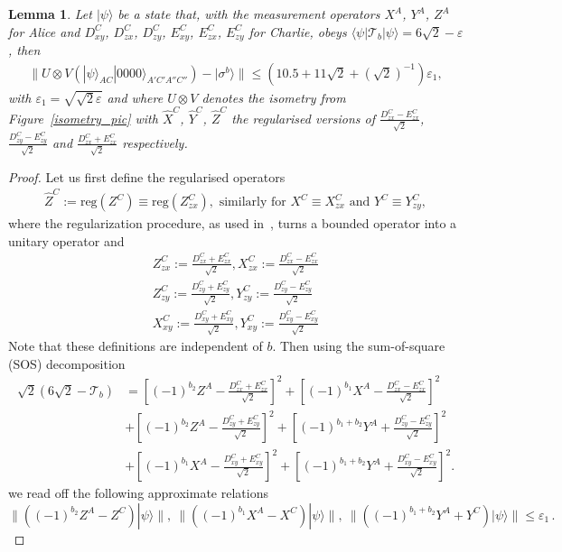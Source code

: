 \documentclass[onecolumn,prx,amsmath,amssymb,12pt]{revtex4-2}
\newtheorem{lem}{Lemma}
\def\bra#1{\langle#1|} \def\ket#1{|#1\rangle}
\def\norm#1{\| #1 \| }
\begin{document}
\begin{appendix}
\begin{lem} \label{lem1} Let  $\ket{\psi}$ be a state that, with the measurement operators $X^A$, $Y^A$, $Z^A$ for Alice and $D^C_{xy}$, $D^C_{zx}$, $D^C_{zy}$, $E^C_{xy}$, $E^C_{zx}$, $E^C_{zy}$ for Charlie, obeys $\bra{\psi}\mathscr{T}_b\ket{\psi}=6\sqrt{2}-\varepsilon$, then
\begin{align}
    \norm{U\otimes V\left(\ket{\psi}_{{AC}}\ket{0000}_{A'C'A''C''}\right) - \ket{\sigma^b}}  \leq  (10.5+11\sqrt{2}+(\sqrt{2})^{-1})\varepsilon_1,
    \label{eps2}
\end{align}
with $\varepsilon_1=\sqrt{\sqrt{2}\varepsilon}$ and where $U \otimes V$ denotes the isometry from Figure~\ref{isometry_pic} with $\hat{X}^C$, $\hat{Y}^C$, $\hat{Z}^C$ the regularised versions of $\frac{D^C_{zx}-E^C_{zx}}{\sqrt{2}}$, $\frac{D^C_{zy}-E^C_{zy}}{\sqrt{2}}$ and  $\frac{D^C_{zx}+E^C_{zx}}{\sqrt{2}}$ respectively.
\end{lem}


\begin{proof}
Let us first define the regularised operators
\begin{align}
    \hat Z^C := \text{reg}(Z^C) \equiv \text{reg}(Z^C_{zx}), \text{ similarly for } X^C \equiv X^C_{zx} \text{ and } Y^C\equiv Y^C_{zy},
\end{align}
where the regularization procedure, as used in~\cite{self_testing}, turns a bounded operator into a unitary operator and 
\begin{align}
    Z^C_{zx}:=\frac{D^C_{zx}+E^C_{zx}}{\sqrt{2}}, X^C_{zx}:=\frac{D^C_{zx}-E^C_{zx}}{\sqrt{2}}\\
    Z^C_{zy}:=\frac{D^C_{zy}+E^C_{zy}}{\sqrt{2}}, Y^C_{zy}:=\frac{D^C_{zy}-E^C_{zy}}{\sqrt{2}}\\
    X^C_{xy}:=\frac{D^C_{xy}+E^C_{xy}}{\sqrt{2}}, Y^C_{xy}:=\frac{D^C_{xy}-E^C_{xy}}{\sqrt{2}}
\end{align}
Note that these definitions are independent of $b$. Then using the sum-of-square (SOS) decomposition
\begin{align}
    \sqrt{2}(6\sqrt{2}-\mathscr{T}_b)&=\left[(-1)^{b_2}Z^A-\frac{D^C_{zx}+E^C_{zx}}{\sqrt{2}}\right]^2 + \left[(-1)^{b_1}X^A-\frac{D^C_{zx}-E^C_{zx}}{\sqrt{2}}\right]^2\\
    &+\left[(-1)^{b_2}Z^A-\frac{D^C_{zy}+E^C_{zy}}{\sqrt{2}}\right]^2 + \left[(-1)^{b_1+b_2}Y^A+\frac{D^C_{zy}-E^C_{zy}}{\sqrt{2}}\right]^2\\
    &+\left[(-1)^{b_1}X^A-\frac{D^C_{xy}+E^C_{xy}}{\sqrt{2}}\right]^2 + \left[(-1)^{b_1+b_2}Y^A+\frac{D^C_{xy}-E^C_{xy}}{\sqrt{2}}\right]^2.
\end{align}
we read off the following approximate relations
\begin{equation}\label{eq:CtoA}
\norm{((-1)^{b_2}Z^A-Z^C)\ket{\psi}}, \ \norm{((-1)^{b_1}X^A-X^C)\ket{\psi}}, \ \norm{((-1)^{b_1+b_2}Y^A+Y^C)\ket{\psi}} \leq \varepsilon_1\,.
\end{equation}


\end{proof}
\end{appendix}
\end{document}
